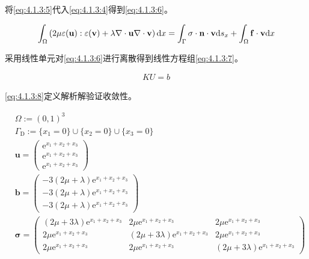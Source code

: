 将\eqref{eq:4.1.3:5}代入\eqref{eq:4.1.3:4}得到\eqref{eq:4.1.3:6}。  
   
\begin{align}\label{eq:4.1.3:6}
  \int_{\Omega}\left(2\mu\mathbf \varepsilon(\mathbf u) :\mathbf\varepsilon(\mathbf v)+\lambda\nabla\cdot\mathbf u \nabla\cdot\mathbf v\right)\mathrm{d} x =
  \int_{\Gamma}\sigma\cdot\mathbf n\cdot\mathbf v\mathrm{d} s_x + \int_{\Omega}\mathbf f\cdot\mathbf v\mathrm{d} x
\end{align}

采用线性单元对\eqref{eq:4.1.3:6}进行离散得到线性方程组\eqref{eq:4.1.3:7}。
   
\begin{align}\label{eq:4.1.3:7}
  KU = b
\end{align}

\eqref{eq:4.1.3:8}定义解析解验证收敛性。

\begin{equation}\label{eq:4.1.3:8}
  \begin{split}
    &\Omega:=(0,1)^3\\
    &\Gamma_{\mathrm D}:=\{x_1=0\}\cup\{x_2=0\}\cup\{x_3=0\} \\
    &\mathbf u = \left(\begin{array}{c} 
      \mathrm e^{x_1+x_2+x_3}\\
      \mathrm e^{x_1+x_2+x_3}\\
      \mathrm e^{x_1+x_2+x_3}
    \end{array}\right)\\
    &\mathbf b = \left(\begin{array}{c}
      -3  (2  \mu + \lambda)  \mathrm e^{x_1+x_2+x_3}\\
      -3  (2  \mu + \lambda)  \mathrm e^{x_1+x_2+x_3}\\
      -3  (2  \mu + \lambda)  \mathrm e^{x_1+x_2+x_3}
    \end{array}\right)\\
    &\mathbf \sigma 
    =\left(\begin{array}{ccc}
      (2\mu + 3\lambda)\mathrm e^{x_1+x_2+x_3} & 2\mu\mathrm e^{x_1+x_2+x_3} & 2\mu\mathrm e^{x_1+x_2+x_3}\\
      2\mu\mathrm e^{x_1+x_2+x_3} & (2\mu + 3\lambda)\mathrm e^{x_1+x_2+x_3} &  2\mu\mathrm e^{x_1+x_2+x_3}\\
      2\mu\mathrm e^{x_1+x_2+x_3} & 2\mu\mathrm e^{x_1+x_2+x_3} & (2\mu + 3\lambda)\mathrm e^{x_1+x_2+x_3}  
    \end{array}\right)
  \end{split}
\end{equation}

